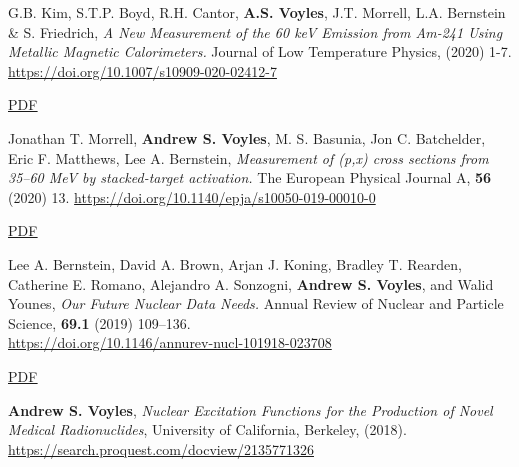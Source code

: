 \begin{bibsection}
\item G.B. Kim, S.T.P. Boyd, R.H. Cantor, \textbf{A.S. Voyles}, J.T. Morrell, L.A. Bernstein \& S. Friedrich, \emph{A New Measurement of the 60 keV Emission from Am-241 Using Metallic Magnetic Calorimeters.} Journal of Low Temperature Physics,  (2020) 1-7. \url{https://doi.org/10.1007/s10909-020-02412-7} 

\ifshort \vspace{0.1cm} \href{https://avoyles.github.io/papers/Kim2020_Calorimeter.pdf}{\underline{PDF}} \else  \fi 




\item Jonathan T. Morrell, \textbf{Andrew S. Voyles}, M. S. Basunia, Jon C. Batchelder, Eric F. Matthews, Lee A. Bernstein, \emph{Measurement of (p,x) cross sections from 35--60 MeV by stacked-target activation.} The European Physical Journal A, \textbf{56} (2020) 13. \url{https://doi.org/10.1140/epja/s10050-019-00010-0} 

\ifshort \vspace{0.1cm} \href{https://avoyles.github.io/papers/Morrell2020_LaCe.pdf}{\underline{PDF}} \else  \fi 


\item Lee A. Bernstein,  David A. Brown,  Arjan J. Koning, Bradley T. Rearden,  Catherine E. Romano, Alejandro A. Sonzogni,  \textbf{Andrew S. Voyles}, and Walid Younes, \emph{Our Future Nuclear Data Needs.} Annual Review of Nuclear and Particle Science, \textbf{69.1} (2019) 109--136.
\\ \url{https://doi.org/10.1146/annurev-nucl-101918-023708}


\ifshort \vspace{0.1cm} \href{https://avoyles.github.io/papers/Bernstein2019_NuclearData.pdf}{\underline{PDF}} \else  \fi 



\ifshort 
\item \textbf{Andrew S. Voyles}, \emph{Nuclear Excitation Functions for the Production of Novel Medical Radionuclides}, University of California, Berkeley, (2018). \url{https://search.proquest.com/docview/2135771326}
\else  \fi 



\end{bibsection}
